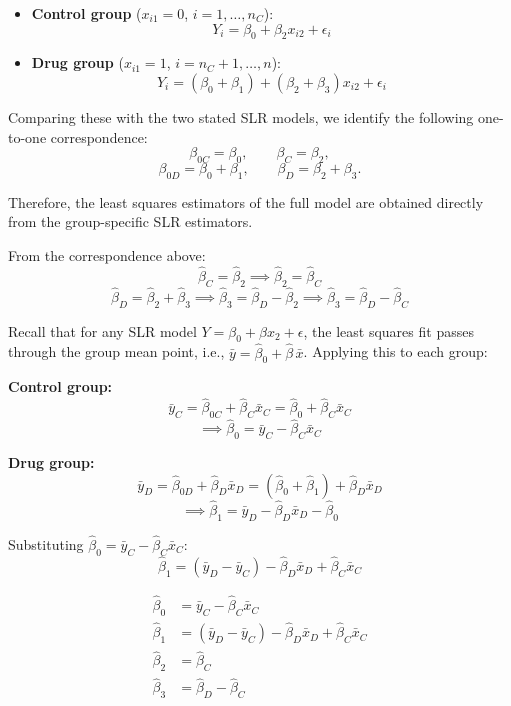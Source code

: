 \documentclass[letterpaper]{article}
\begin{document}
	\begin{itemize}
		\item \textbf{Control group} ($x_{i1} = 0$, $i = 1, \ldots, n_C$):
		\[
		Y_i = \beta_0 + \beta_2 x_{i2} + \epsilon_i
		\]
		\item \textbf{Drug group} ($x_{i1} = 1$, $i = n_C+1, \ldots, n$):
		\[
		Y_i = (\beta_0 + \beta_1) + (\beta_2 + \beta_3) x_{i2} + \epsilon_i
		\]
	\end{itemize}
	
	Comparing these with the two stated SLR models, we identify the following one-to-one correspondence:
	\[
	\beta_{0C} = \beta_0, \qquad \beta_C = \beta_2,
	\]
	\[
	\beta_{0D} = \beta_0 + \beta_1, \qquad \beta_D = \beta_2 + \beta_3.
	\]
	
	Therefore, the least squares estimators of the full model are obtained directly from the group-specific SLR estimators.
	
	
	From the correspondence above:
	\[
	\hat{\beta}_C = \hat{\beta}_2 \implies \boxed{\hat{\beta}_2 = \hat{\beta}_C}
	\]
	\[
	\hat{\beta}_D = \hat{\beta}_2 + \hat{\beta}_3 \implies \hat{\beta}_3 = \hat{\beta}_D - \hat{\beta}_2 \implies \boxed{\hat{\beta}_3 = \hat{\beta}_D - \hat{\beta}_C}
	\]
	
	Recall that for any SLR model $Y = \beta_0 + \beta x_2 + \epsilon$, the least squares fit passes through the group mean point, i.e., $\bar{y} = \hat{\beta}_0 + \hat{\beta}\,\bar{x}$. Applying this to each group:
	
	\textbf{Control group:}
	\[
	\bar{y}_C = \hat{\beta}_{0C} + \hat{\beta}_C \bar{x}_C = \hat{\beta}_0 + \hat{\beta}_C \bar{x}_C
	\]
	\[
	\implies \boxed{\hat{\beta}_0 = \bar{y}_C - \hat{\beta}_C \bar{x}_C}
	\]
	
	\textbf{Drug group:}
	\[
	\bar{y}_D = \hat{\beta}_{0D} + \hat{\beta}_D \bar{x}_D = (\hat{\beta}_0 + \hat{\beta}_1) + \hat{\beta}_D \bar{x}_D
	\]
	\[
	\implies \hat{\beta}_1 = \bar{y}_D - \hat{\beta}_D \bar{x}_D - \hat{\beta}_0
	\]
	
	Substituting $\hat{\beta}_0 = \bar{y}_C - \hat{\beta}_C \bar{x}_C$:
	\[
	\boxed{\hat{\beta}_1 = (\bar{y}_D - \bar{y}_C) - \hat{\beta}_D \bar{x}_D + \hat{\beta}_C \bar{x}_C}
	\]
	
	\begin{align*}
		\hat{\beta}_0 &= \bar{y}_C - \hat{\beta}_C \bar{x}_C \\[6pt]
		\hat{\beta}_1 &= (\bar{y}_D - \bar{y}_C) - \hat{\beta}_D \bar{x}_D + \hat{\beta}_C \bar{x}_C \\[6pt]
		\hat{\beta}_2 &= \hat{\beta}_C \\[6pt]
		\hat{\beta}_3 &= \hat{\beta}_D - \hat{\beta}_C
	\end{align*}
	
\end{document}
